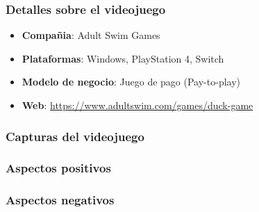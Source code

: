 \documentclass[12pt, spanish]{article}
\begin{document}
\subsubsection{Detalles sobre el videojuego}

\begin{itemize}
	\item \textbf{Compañia}: Adult Swim Games
	\item \textbf{Plataformas}: Windows, PlayStation 4, Switch
	\item \textbf{Modelo de negocio}: Juego de pago (Pay-to-play)
	\item \textbf{Web}: \url{https://www.adultswim.com/games/duck-game}
\end{itemize}

\subsubsection{Capturas del videojuego}

\subsubsection{Aspectos positivos}

\subsubsection{Aspectos negativos}
\end{document}
